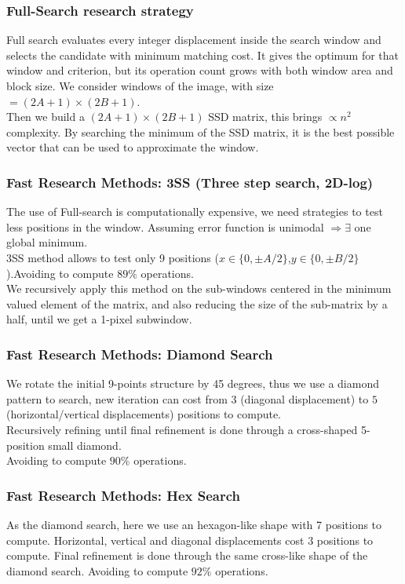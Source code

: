 \newpage
\subsubsection{Full-Search research strategy}
Full search evaluates every integer displacement inside the search window and selects the candidate with minimum matching cost. It gives the optimum for that window and criterion, but its operation count grows with both window area and block size.
We consider windows of the image, with size $=(2A+1)\times (2B+1)$.\\
Then we build a $(2A+1)\times (2B+1)$ SSD matrix, this brings $\propto n^2$ complexity.
By searching the minimum of the SSD matrix, it is the best possible vector that can be used to approximate the window.
\subsubsection{Fast Research Methods: 3SS (Three step search, 2D-log)}
The use of Full-search is computationally expensive, we need strategies to test less positions in the window. Assuming error function is unimodal $\Rightarrow \exists$ one global minimum.\\
3SS method allows to test only 9 positions ($x \in \{0, \pm A/2\}$,$y \in \{0, \pm B/2\}$).Avoiding to compute $89\%$ operations.\\
We recursively apply this method on the sub-windows centered in the minimum valued element of the matrix, and also reducing the size of the sub-matrix by a half, until we get a 1-pixel subwindow.
\subsubsection{Fast Research Methods: Diamond Search}
We rotate the initial 9-points structure by 45 degrees, thus we use a diamond pattern to search, new iteration can cost from $3$ (diagonal displacement) to $5$ (horizontal/vertical displacements) positions to compute.\\
Recursively refining until final refinement is done through a cross-shaped 5-position small diamond.\\
Avoiding to compute $90\%$ operations.
\subsubsection{Fast Research Methods: Hex Search}
As the diamond search, here we use an hexagon-like shape with 7 positions to compute. Horizontal, vertical and diagonal displacements cost 3 positions to compute.
Final refinement is done through the same cross-like shape of the diamond search. Avoiding to compute $92\%$ operations.
